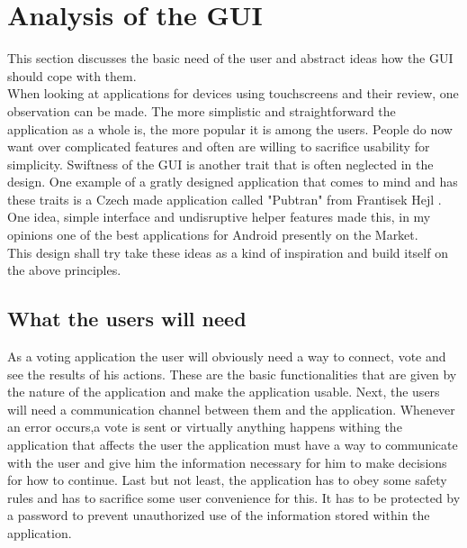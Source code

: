 \documentclass[11pt]{article} %
\begin{document}
\section{Analysis of the GUI}
This section discusses the basic need of the user and abstract ideas how the GUI should cope with them. \\
When looking at applications for devices using touchscreens and their review, one observation can be made. The more simplistic and straightforward the application as a whole is, the more popular it is among the users. People do now want over complicated features and often are willing to sacrifice usability for simplicity. Swiftness of the GUI is another trait that is often neglected in the design. One example of a gratly designed application that comes to mind and has these traits is a Czech made application called "Pubtran" from Frantisek Hejl \cite{pubtran}. One idea, simple interface and undisruptive helper features made this, in my opinions one of the best applications for Android presently on the Market.\\
This design shall try take these ideas as a kind of inspiration and build itself on the above principles. 
\subsection{What the users will need}
As a voting application the user will obviously need a way to connect, vote and see the results of his actions. These are the basic functionalities that are given by the nature of the application and make the application usable. Next, the users will need a communication channel between them and the application. Whenever an error occurs,a vote is sent or virtually anything happens withing the application that affects the user the application must have a way to communicate with the user and give him the information necessary for him to make decisions for how to continue. Last but not least, the application has to obey some safety rules and has to sacrifice some user convenience for this. It has to be protected by a password to prevent unauthorized use of the information stored within the application.
\end{document}

